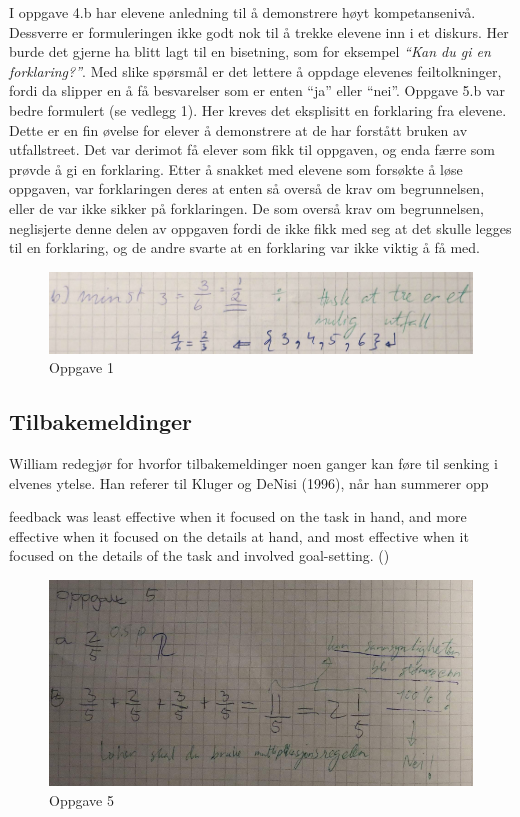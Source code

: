 \documentclass[main.tex]{subfiles}
\begin{document}
I oppgave 4.b har elevene anledning til å demonstrere høyt kompetansenivå. Dessverre er formuleringen ikke
godt nok til å trekke elevene inn i et diskurs. Her burde det gjerne ha blitt lagt til en bisetning, som 
for eksempel \emph{``Kan du gi en forklaring?''}. Med slike spørsmål er det lettere å oppdage elevenes
feiltolkninger, fordi da slipper en å få besvarelser som er enten ``ja'' eller ``nei''. Oppgave 
5.b var bedre formulert (se vedlegg 1). Her kreves det eksplisitt en forklaring fra elevene.
Dette er en fin øvelse for elever å demonstrere at de har forstått bruken av utfallstreet. Det var derimot
få elever som fikk til oppgaven, og enda færre som prøvde å gi en forklaring. Etter å snakket med elevene
som forsøkte å løse oppgaven, var forklaringen deres at enten så overså de krav om begrunnelsen, eller de var
ikke sikker på forklaringen. De som overså krav om begrunnelsen, neglisjerte denne delen av oppgaven fordi
de ikke fikk med seg at det skulle legges til en forklaring, og de andre svarte at en forklaring var ikke
viktig å få med.

\begin{figure}[h]
\centering
\includegraphics[scale = 0.4]{../figures/maryam.png}
\caption{Oppgave 1}
\label{fig:maryam}
\end{figure}

\subsection*{Tilbakemeldinger}

William redegjør for hvorfor tilbakemeldinger noen ganger kan føre til senking 
i elvenes ytelse. Han referer til Kluger og DeNisi (1996), når han summerer opp 
\begin{displayquote}
\textelp{} feedback was least effective when it focused on the task in hand, 
and more effective when it focused on the details at hand, and most effective 
when it focused on the details of the task and involved goal-setting.
()
\end{displayquote}

\begin{figure}[h!]
\centering
\includegraphics[scale = 0.4]{../figures/mohsin.png}
\caption{Oppgave 5}
\label{fig:mohsin}
\end{figure}
\end{document}
